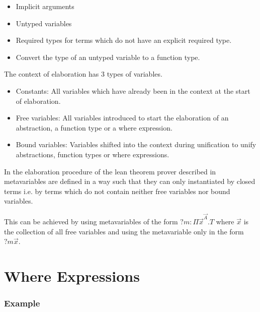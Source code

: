 \begin{itemize}

\item Implicit arguments

\item Untyped variables

\item Required types for terms which do not have an explicit required type.

\item Convert the type of an untyped variable to a function type.

\end{itemize}


The context of elaboration has 3 types of variables.

\begin{itemize}

\item Constants: All variables which have already been in the context at the
start of elaboration.

\item Free variables: All variables introduced to start the elaboration of an
abstraction, a function type or a where expression.

\item Bound variables: Variables shifted into the context during unification to
unify abstractions, function types or where expressions.

\end{itemize}

In the elaboration procedure of the lean theorem prover described in
\cite{demoura2015} metavariables are defined in a way such that they can only
instantiated by closed terms i.e. by terms which do not contain neither free
variables nor bound variables.

This can be achieved by using metavariables of the form $?m: \Pi
\vec{x}^{\vec{A}}.T$ where $\vec{x}$ is the collection of all free variables and
using the metavariable only in the form $?m \vec{x}$.








\section{Where Expressions}


\subsubsection{Example}

